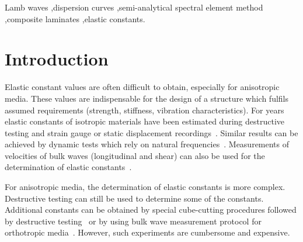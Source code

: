 \begin{frontmatter}
		\begin{keyword}
			
			Lamb waves \sep dispersion curves \sep semi-analytical spectral element method \sep composite laminates \sep elastic constants.
			
			
			
			
			
		\end{keyword}
		
	\end{frontmatter}
	
	
	
	
	
	
\section{Introduction}
	
	Elastic constant values are often difficult to obtain, especially for anisotropic media. These values are indispensable for the design of a structure which fulfils assumed requirements (strength, stiffness, vibration characteristics). For years elastic constants of isotropic materials have been estimated during destructive testing and strain gauge or static displacement recordings~\cite{Wang2000}. Similar results can be achieved by dynamic tests which rely on natural frequencies~\cite{Wang2000a, Wesolowski2009,Beluch2014}. Measurements of velocities of bulk waves (longitudinal and shear) can also be used for the determination of elastic constants~\cite{Rose1999}.
	
	For anisotropic media, the determination of elastic constants is more complex. Destructive testing can still be used to determine some of the constants. Additional constants can be obtained by special cube-cutting procedures followed by destructive testing~\cite{Rose1991} or by using bulk wave measurement protocol for orthotropic media~\cite{Rose1999}. However, such experiments are cumbersome and expensive. 
	
	

